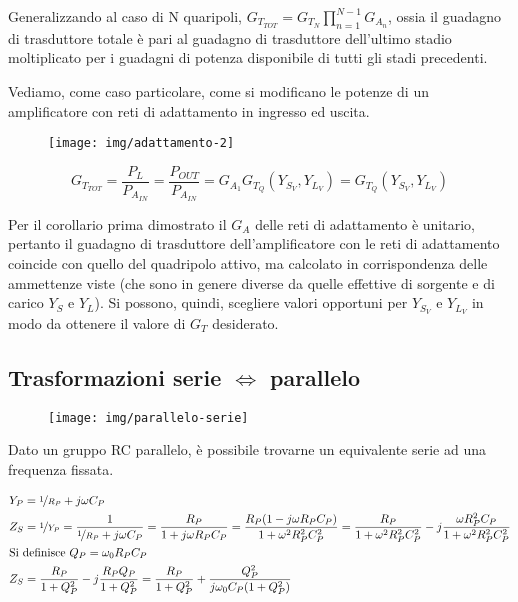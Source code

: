 Generalizzando al caso di N quaripoli,
$G_{T_{TOT}} = G_{T_N} \prod_{n=1}^{N-1} G_{A_n}$,
ossia il guadagno di trasduttore totale è pari al guadagno di trasduttore dell'ultimo stadio moltiplicato per i guadagni di potenza disponibile di tutti gli stadi precedenti.


Vediamo, come caso particolare, come si modificano le potenze di un amplificatore con reti di adattamento in ingresso ed uscita.

\begin{figure}[hbt]
	\centering
	\texttt{[image: img/adattamento-2]}
	\caption{}
	\label{fig:adatttamento1}
\end{figure}
\[
G_{T_{TOT}} = \frac{P_L}{P_{A_{IN}}}
=
\frac{P_{OUT}}{P_{A_{IN}}}
=
G_{A_1} G_{T_Q}(Y_{S_V}, Y_{L_V})
= G_{T_Q}(Y_{S_V}, Y_{L_V})
\]

Per il corollario prima dimostrato il $G_A$ delle reti di adattamento è unitario, pertanto il guadagno di trasduttore dell'amplificatore con le reti di adattamento coincide con quello del quadripolo attivo, ma calcolato in corrispondenza delle ammettenze viste (che sono in genere diverse da quelle effettive di sorgente e di carico $Y_S$ e $Y_L$). Si possono, quindi, scegliere valori opportuni per $Y_{S_V}$ e $Y_{L_V}$ in modo da ottenere il valore di $G_T$ desiderato.

\subsection{Trasformazioni serie $\Leftrightarrow$ parallelo}
	
\begin{figure}[h!]
	\centering
	\texttt{[image: img/parallelo-serie]}
	\caption{}
	\label{fig:parallelo-serie}
\end{figure}

Dato un gruppo RC parallelo, è possibile trovarne un equivalente serie ad una frequenza fissata.

\begin{align*}
&Y_P = \nicefrac{1}{R_P} + j \omega C_P\\
&Z_S = \nicefrac{1}{Y_P} =
\frac{1}{\nicefrac{1}{R_P} + j \omega C_P} =
\frac{R_P}{1 + j \omega R_P C_P} = 
\frac{R_P (1- j \omega R_P C_P)}{1 + \omega^2 R_P^2 C_P^2} = \frac{R_P}{1 + \omega^2 R_P^2 C_P^2} - j \frac{\omega R_P^2 C_P}{1 + \omega^2 R_P^2 C_P^2}\\
&\mbox{Si definisce } Q_P = \omega_0 R_P C_P\\
& Z_S = \frac{R_P}{1 + Q_P^2} - j \frac{R_P Q_P}{1 + Q_P^2} = 
\frac{R_P}{1 + Q_P^2} + \frac{Q_P^2}{j \omega_0
	C_P (1 + Q_P^2)}
\end{align*}

